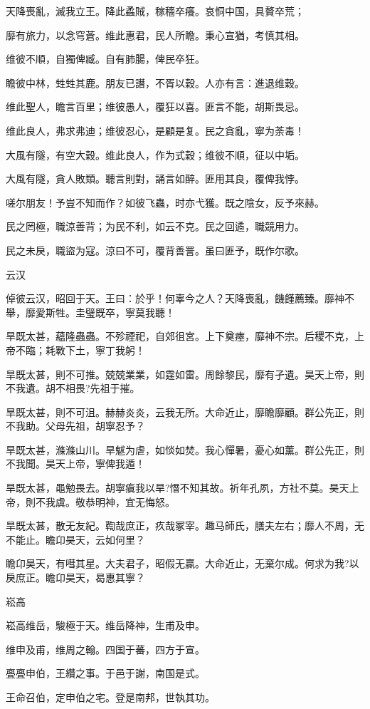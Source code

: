 天降喪亂，滅我立王。降此蟊賊，稼穡卒癢。哀恫中国，具贅卒荒；

靡有旅力，以念穹蒼。维此惠君，民人所瞻。秉心宣猶，考慎其相。

维彼不順，自獨俾臧。自有肺腸，俾民卒狂。

瞻彼中林，甡甡其鹿。朋友已譖，不胥以穀。人亦有言：進退维穀。

维此聖人，瞻言百里；维彼愚人，覆狂以喜。匪言不能，胡斯畏忌。

维此良人，弗求弗迪；维彼忍心，是顧是复。民之貪亂，寧为荼毒！

大風有隧，有空大穀。维此良人，作为式穀；维彼不順，征以中垢。

大風有隧，貪人敗類。聽言則對，誦言如醉。匪用其良，覆俾我悖。

嗟尔朋友！予豈不知而作？如彼飞蟲，时亦弋獲。既之陰女，反予來赫。

民之罔極，職涼善背；为民不利，如云不克。民之回遹，職競用力。

民之未戾，職盜为寇。涼曰不可，覆背善詈。虽曰匪予，既作尔歌。

云汉

倬彼云汉，昭回于天。王曰：於乎！何辜今之人？天降喪亂，饑饉薦臻。靡神不舉，靡愛斯牲。圭璧既卒，寧莫我聽！

旱既太甚，蘊隆蟲蟲。不殄禋祀，自郊徂宮。上下奠瘞，靡神不宗。后稷不克，上帝不臨；耗斁下土，寧丁我躬！

旱既太甚，則不可推。兢兢業業，如霆如雷。周餘黎民，靡有孑遺。昊天上帝，則不我遺。胡不相畏?先祖于摧。

旱既太甚，則不可沮。赫赫炎炎，云我无所。大命近止，靡瞻靡顧。群公先正，則不我助。父母先祖，胡寧忍予？

旱既太甚，滌滌山川。旱魃为虐，如惔如焚。我心憚暑，憂心如薰。群公先正，則不我聞。昊天上帝，寧俾我遁！

旱既太甚，黽勉畏去。胡寧瘨我以旱?憯不知其故。祈年孔夙，方社不莫。昊天上帝，則不我虞。敬恭明神，宜无悔怒。

旱既太甚，散无友紀。鞫哉庶正，疚哉冢宰。趣马師氏，膳夫左右；靡人不周，无不能止。瞻卬昊天，云如何里？

瞻卬昊天，有嘒其星。大夫君子，昭假无贏。大命近止，无棄尔成。何求为我?以戾庶正。瞻卬昊天，曷惠其寧？

崧高

崧高维岳，駿極于天。维岳降神，生甫及申。

维申及甫，维周之翰。四国于蕃，四方于宣。

亹亹申伯，王纘之事。于邑于謝，南国是式。

王命召伯，定申伯之宅。登是南邦，世執其功。

